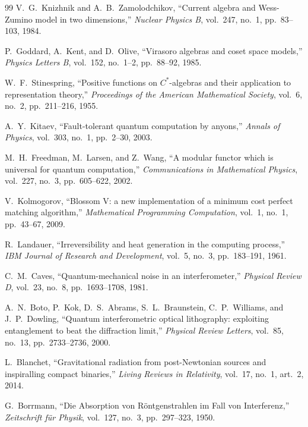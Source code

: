 \documentclass[11pt,onecolumn]{article}
\begin{document}
\FloatBarrier
\begin{thebibliography}{99}
V.~G.~Knizhnik and A.~B.~Zamolodchikov,
``Current algebra and Wess-Zumino model in two dimensions,''
\emph{Nuclear Physics B}, vol.~247, no.~1, pp.~83--103, 1984.

P.~Goddard, A.~Kent, and D.~Olive,
``Virasoro algebras and coset space models,''
\emph{Physics Letters B}, vol.~152, no.~1--2, pp.~88--92, 1985.

W.~F.~Stinespring,
``Positive functions on $C^*$-algebras and their application to representation theory,''
\emph{Proceedings of the American Mathematical Society}, vol.~6, no.~2, pp.~211--216, 1955.

A.~Y.~Kitaev,
``Fault-tolerant quantum computation by anyons,''
\emph{Annals of Physics}, vol.~303, no.~1, pp.~2--30, 2003.

M.~H.~Freedman, M.~Larsen, and Z.~Wang,
``A modular functor which is universal for quantum computation,''
\emph{Communications in Mathematical Physics}, vol.~227, no.~3, pp.~605--622, 2002.

V.~Kolmogorov,
``Blossom V: a new implementation of a minimum cost perfect matching algorithm,''
\emph{Mathematical Programming Computation}, vol.~1, no.~1, pp.~43--67, 2009.

R.~Landauer,
``Irreversibility and heat generation in the computing process,''
\emph{IBM Journal of Research and Development}, vol.~5, no.~3, pp.~183--191, 1961.

C.~M.~Caves,
``Quantum-mechanical noise in an interferometer,''
\emph{Physical Review D}, vol.~23, no.~8, pp.~1693--1708, 1981.

A.~N.~Boto, P.~Kok, D.~S.~Abrams, S.~L.~Braunstein, C.~P.~Williams, and J.~P.~Dowling,
``Quantum interferometric optical lithography: exploiting entanglement to beat the diffraction limit,''
\emph{Physical Review Letters}, vol.~85, no.~13, pp.~2733--2736, 2000.

L.~Blanchet,
``Gravitational radiation from post-Newtonian sources and inspiralling compact binaries,''
\emph{Living Reviews in Relativity}, vol.~17, no.~1, art.~2, 2014.

G.~Borrmann,
``Die Absorption von Röntgenstrahlen im Fall von Interferenz,''
\emph{Zeitschrift für Physik}, vol.~127, no.~3, pp.~297--323, 1950.


\end{thebibliography}
\end{document}
